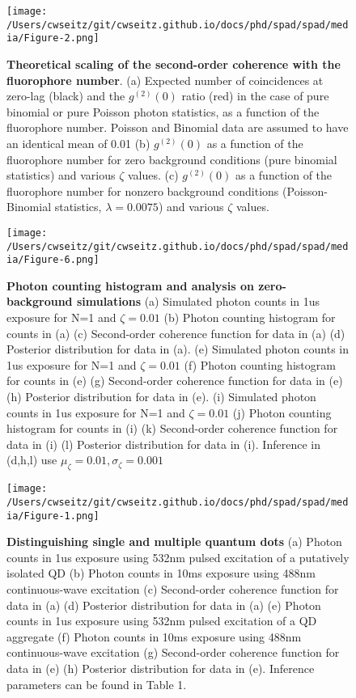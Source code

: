 \begin{figure}[t]
\centering
\texttt{[image: /Users/cwseitz/git/cwseitz.github.io/docs/phd/spad/spad/media/Figure-2.png]}
\caption{\textbf{Theoretical scaling of the second-order coherence with the fluorophore number}. (a) Expected number of coincidences at zero-lag (black) and the $g^{(2)}(0)$ ratio (red) in the case of pure binomial or pure Poisson photon statistics, as a function of the fluorophore number. Poisson and Binomial data are assumed to have an identical mean of 0.01 (b) $g^{(2)}(0)$ as a function of the fluorophore number for zero background conditions (pure binomial statistics) and various $\zeta$ values. (c) $g^{(2)}(0)$ as a function of the fluorophore number for nonzero background conditions (Poisson-Binomial statistics, $\lambda=0.0075$) and various $\zeta$ values.}
\label{fig:binomvpoiss}
\end{figure}  

\begin{figure}[t]
\centering
\texttt{[image: /Users/cwseitz/git/cwseitz.github.io/docs/phd/spad/spad/media/Figure-6.png]}
\caption{\textbf{Photon counting histogram and analysis on zero-background simulations} (a) Simulated photon counts in 1us exposure for N=1 and $\zeta=0.01$ (b) Photon counting histogram for counts in (a) (c) Second-order coherence function for data in (a) (d) Posterior distribution for data in (a). (e) Simulated photon counts in 1us exposure for N=1 and $\zeta=0.01$ (f) Photon counting histogram for counts in (e) (g) Second-order coherence function for data in (e) (h) Posterior distribution for data in (e). (i) Simulated photon counts in 1us exposure for N=1 and $\zeta=0.01$ (j) Photon counting histogram for counts in (i) (k) Second-order coherence function for data in (i) (l) Posterior distribution for data in (i). Inference in (d,h,l) use $\mu_\zeta=0.01,\sigma_\zeta=0.001$}
\label{fig:pch}
\end{figure}  

\begin{figure}[t]
\centering
\texttt{[image: /Users/cwseitz/git/cwseitz.github.io/docs/phd/spad/spad/media/Figure-1.png]}
\caption{\textbf{Distinguishing single and multiple quantum dots} (a) Photon counts in 1us exposure using 532nm pulsed excitation of a putatively isolated QD (b) Photon counts in 10ms exposure using 488nm continuous-wave excitation (c) Second-order coherence function for data in (a) (d) Posterior distribution for data in (a) (e) Photon counts in 1us exposure using 532nm pulsed excitation of a QD aggregate (f) Photon counts in 10ms exposure using 488nm continuous-wave excitation (g) Second-order coherence function for data in (e) (h) Posterior distribution for data in (e). Inference parameters can be found in Table 1.}
\label{fig:qdagg}
\end{figure}  

